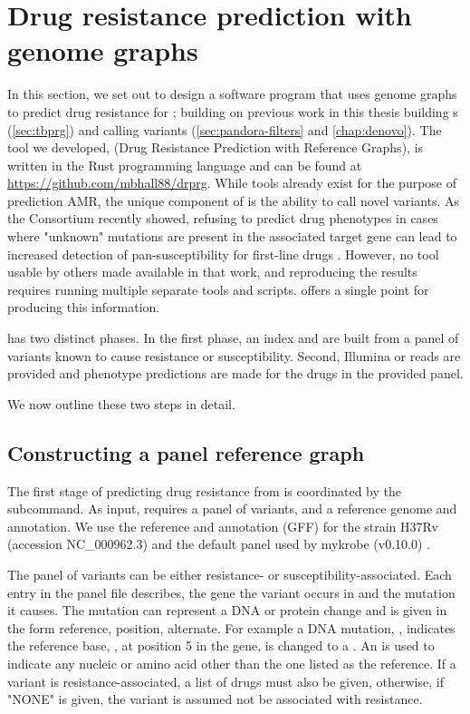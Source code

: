 \section{Drug resistance prediction with genome graphs}
In this section, we set out to design a software program that uses genome graphs to predict drug resistance for \mtb{}; building on previous work in this thesis building \mtb{} \prg{}s (\autoref{sec:tbprg}) and calling variants (\autoref{sec:pandora-filters} and \autoref{chap:denovo}). The tool we developed, \drprg{} (Drug Resistance Prediction with Reference Graphs), is written in the Rust programming language and can be found at \url{https://github.com/mbhall88/drprg}.
While tools already exist for the purpose of prediction AMR, the unique component of \drprg{} is the ability to call novel variants. As the \cryptic{} Consortium recently showed, refusing to predict drug phenotypes in cases where "unknown" mutations are present in the associated target gene can lead to increased detection of pan-susceptibility for first-line drugs \cite{cryptic2018}. However, no tool usable by others made available in that work, and reproducing the results requires running multiple separate tools and scripts. \drprg{} offers a single point for producing this information.

\drprg{} has two distinct phases. In the first phase, an index and \prg{} are built from a panel of variants known to cause resistance or susceptibility. Second, Illumina or \ont{} reads are provided and phenotype predictions are made for the drugs in the provided panel.

We now outline these two steps in detail.

\subsection{Constructing a panel reference graph}
\label{sec:drprg-index}
The first stage of predicting drug resistance from \drprg{} is coordinated by the  subcommand. As input,  requires a panel of variants, and a reference genome and annotation. We use the reference and annotation (GFF) for the \mtb{} strain H37Rv (accession NC\_000962.3) and the default panel used by mykrobe (v0.10.0) \cite{hunt2019}. 

The panel of variants can be either resistance- or susceptibility-associated. Each entry in the panel file describes, the gene the variant occurs in and the mutation it causes. The mutation can represent a DNA or protein change and is given in the form reference, position, alternate. For example a DNA mutation, , indicates the reference base, , at position 5 in the gene, is changed to a . An  is used to indicate any nucleic or amino acid other than the one listed as the reference. If a variant is resistance-associated, a list of drugs must also be given, otherwise, if "NONE" is given, the variant is assumed not be associated with resistance.

